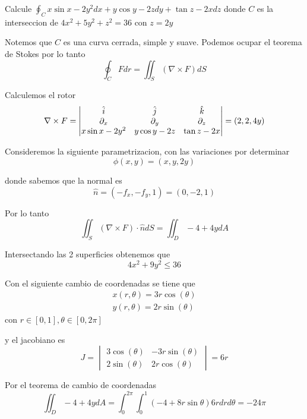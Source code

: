 \message{ !name(MAT024.tex)}\documentclass[../main.tex]{subfiles}
\begin{document}
\begin{problem}
Calcule $\oint_{C} x \sin x - 2y^{2} dx + y \cos y - 2z dy + \tan z - 2x dz$ donde $C$ es la interseccion de $4x^{2} + 5y^{2} + z^{2} = 36$ con $z = 2y$
\end{problem}
\begin{solution}
  Notemos que $C$ es una curva cerrada, simple y suave. Podemos ocupar el teorema de Stokes por lo
  tanto
  \begin{equation*}
    \oint_{C} F dr = \iint_{S} (\nabla \times F) dS
  \end{equation*}

  Calculemos el rotor
  \begin{equation*}
    \nabla \times F = \begin{vmatrix} \hat{i} & \hat{j} & \hat{k}\\ \partial_x & \partial_y & \partial_z\\ x \sin x - 2y^{2} & y \cos y - 2z & \tan z - 2x\end{vmatrix} = (2, 2, 4y)
  \end{equation*}

  Consideremos la siguiente parametrizacion, con las variaciones por determinar
  \begin{equation*}
    \phi(x, y) = (x, y, 2y)
  \end{equation*}

  donde sabemos que la normal es
  \begin{equation*}
    \hat{n} = (-f_{x}, -f_{y}, 1) = (0, -2, 1)
  \end{equation*}

  Por lo tanto
  \begin{equation*}
    \iint_{S} (\nabla \times F) \cdot \hat{n} dS = \iint_{D} -4 + 4y dA
  \end{equation*}

  Intersectando las 2 superficies obtenemos que
  \begin{equation*}
    4x^{2} + 9y^{2} \leq 36
  \end{equation*}

  Con el siguiente cambio de coordenadas se tiene que
  \begin{gather*}
    x(r, \theta) = 3 r \cos(\theta)\\
    y(r, \theta) = 2 r \sin(\theta)
  \end{gather*}
  con $r \in [0, 1], \theta \in [0, 2\pi]$

  y el jacobiano es
  \begin{equation*}
    J = \begin{vmatrix}
      3 \cos(\theta) & -3r\sin(\theta)\\
      2 \sin(\theta) & 2r \cos(\theta)
    \end{vmatrix} = 6r
  \end{equation*}

  Por el teorema de cambio de coordenadas
  \begin{equation*}
    \iint_{D} -4 + 4y dA = \int_{0}^{2\pi}\int_{0}^{1} (-4 + 8r \sin\theta)6r dr d\theta = -24\pi
  \end{equation*}

\end{solution}
\end{document}
